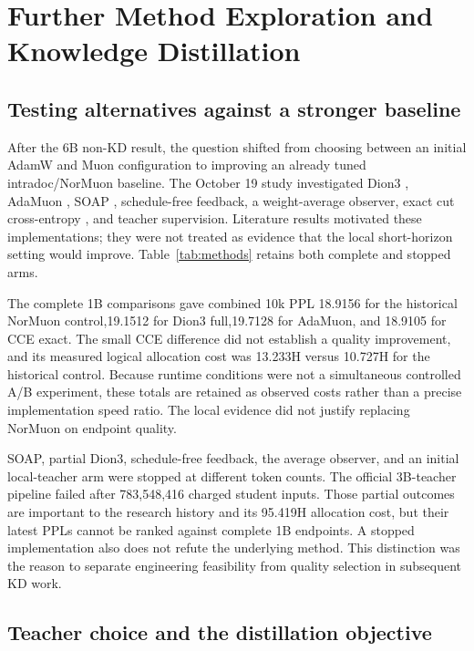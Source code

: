 \section{Further Method Exploration and Knowledge Distillation}
\label{sec:distillation}

\subsection{Testing alternatives against a stronger baseline}

After the 6B non-KD result, the question shifted from choosing between an initial AdamW and Muon configuration to improving an already tuned intradoc/NorMuon baseline. The October 19 study investigated Dion3 \citep{dion3}, AdaMuon \citep{adamuon}, SOAP \citep{soap}, schedule-free feedback, a weight-average observer, exact cut cross-entropy \citep{cce}, and teacher supervision. Literature results motivated these implementations; they were not treated as evidence that the local short-horizon setting would improve. Table~\ref{tab:methods} retains both complete and stopped arms.

The complete 1B comparisons gave combined 10k PPL 18.9156 for the historical NorMuon control,19.1512 for Dion3 full,19.7128 for AdaMuon, and 18.9105 for CCE exact. The small CCE difference did not establish a quality improvement, and its measured logical allocation cost was 13.233H versus 10.727H for the historical control. Because runtime conditions were not a simultaneous controlled A/B experiment, these totals are retained as observed costs rather than a precise implementation speed ratio. The local evidence did not justify replacing NorMuon on endpoint quality.

SOAP, partial Dion3, schedule-free feedback, the average observer, and an initial local-teacher arm were stopped at different token counts. The official 3B-teacher pipeline failed after 783,548,416 charged student inputs. Those partial outcomes are important to the research history and its 95.419H allocation cost, but their latest PPLs cannot be ranked against complete 1B endpoints. A stopped implementation also does not refute the underlying method. This distinction was the reason to separate engineering feasibility from quality selection in subsequent KD work.



\subsection{Teacher choice and the distillation objective}

